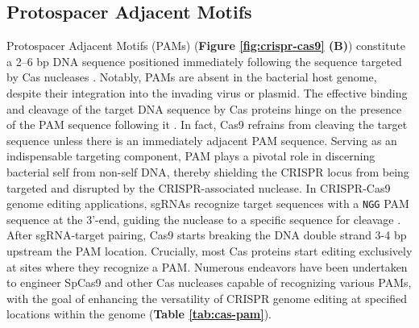 \documentclass[a4paper, titlepage, openright]{book}
\begin{document}
\subsection{Protospacer Adjacent Motifs}\label{subsection:pam}
Protospacer Adjacent Motifs (PAMs) (\textbf{Figure \ref{fig:crispr-cas9} (B)}) constitute a 2–6 bp DNA sequence positioned immediately following the sequence targeted by Cas nucleases \citep{shah2013protospacer}. Notably, PAMs are absent in the bacterial host genome, despite their integration into the invading virus or plasmid. The effective binding and cleavage of the target DNA sequence by Cas proteins hinge on the presence of the PAM sequence following it \citep{jinek2012programmable,shah2013protospacer}. In fact, Cas9 refrains from cleaving the target sequence unless there is an immediately adjacent PAM sequence. Serving as an indispensable targeting component, PAM plays a pivotal role in discerning bacterial self from non-self DNA, thereby shielding the CRISPR locus from being targeted and disrupted by the CRISPR-associated nuclease. In CRISPR-Cas9 genome editing applications, sgRNAs recognize target sequences with a \texttt{NGG} PAM sequence at the 3'-end, guiding the nuclease to a specific sequence for cleavage \citep{cong2013multiplex}. After sgRNA-target pairing, Cas9 starts breaking the DNA double strand 3-4 bp upstream the PAM location. Crucially, most Cas proteins start editing exclusively at sites where they recognize a PAM. Numerous endeavors have been undertaken to engineer SpCas9 and other Cas nucleases capable of recognizing various PAMs, with the goal of enhancing the versatility of CRISPR genome editing at specified locations within the genome \citep{kleinstiver2015engineered} (\textbf{Table \ref{tab:cas-pam}}).

\end{document}
